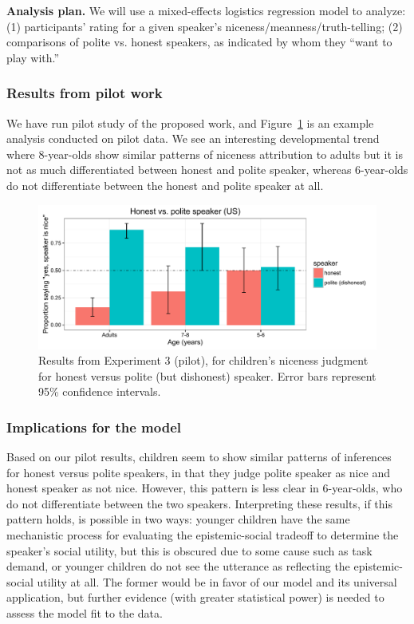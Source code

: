 {\bf Analysis plan.} We will use a mixed-effects logistics regression model to analyze: (1) participants' rating for a given speaker's niceness/meanness/truth-telling; (2) comparisons of polite vs. honest speakers, as indicated by whom they ``want to play with.''

\subsubsection{Results from pilot work}

We have run pilot study of the proposed work, and Figure~\ref{fig:expt3} is an example analysis conducted on pilot data. We see an interesting developmental trend where 8-year-olds show similar patterns of niceness attribution to adults but it is not as much differentiated between honest and polite speaker, whereas 6-year-olds do not differentiate between the honest and polite speaker at all.

\begin{figure}[t]
\begin{centering}
\includegraphics[width=\textwidth]{figures/exp3.pdf}
\caption{\label{fig:expt3} Results from Experiment 3 (pilot), for children's niceness judgment for honest versus polite (but dishonest) speaker. Error bars represent 95\% confidence intervals.}
\end{centering}
\end{figure}


\subsubsection{Implications for the model}

Based on our pilot results, children seem to show similar patterns of inferences for honest versus polite speakers, in that they judge polite speaker as nice and honest speaker as not nice. However, this pattern is less clear in 6-year-olds, who do not differentiate between the two speakers. Interpreting these results, if this pattern holds, is possible in two ways: younger children have the same mechanistic process for evaluating the epistemic-social tradeoff to determine the speaker's social utility, but this is obscured due to some cause such as task demand, or younger children do not see the utterance as reflecting the epistemic-social utility at all. The former would be in favor of our model and its universal application, but further evidence (with greater statistical power) is needed to assess the model fit to the data.




